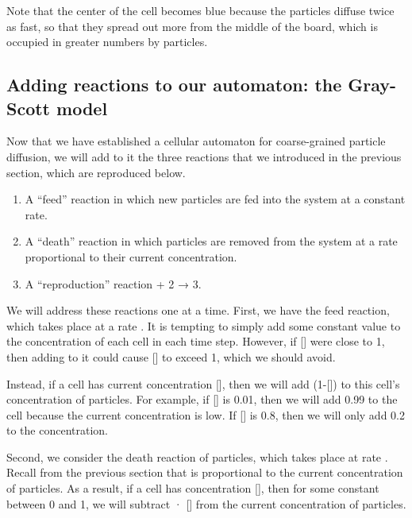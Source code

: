 {{Note that the center of the cell becomes blue because the  particles diffuse twice as fast, so that they spread out more from the middle of the board, which is occupied in greater numbers by  particles.

\FloatBarrier
{}
\subsection{Adding reactions to our automaton: the Gray-Scott model}

Now that we have established a cellular automaton for coarse-grained particle diffusion, we will add to it the three reactions that we introduced in the previous section, which are reproduced below.

\begin{enumerate}
\item A ``feed'' reaction in which new  particles are fed into the system at a constant rate.
\item A ``death'' reaction in which  particles are removed from the system at a rate proportional to their current concentration.
\item A ``reproduction'' reaction  + 2 → 3.
\end{enumerate}

\begin{qbox}\end{qbox}

We will address these reactions one at a time. First, we have the feed reaction, which takes place at a rate . It is tempting to simply add some constant value  to the concentration of each cell in each time step. However, if [] were close to 1, then adding  to it could cause [] to exceed 1, which we should avoid.

Instead, if a cell has current concentration [], then we will add (1-[]) to this cell's concentration of  particles. For example, if [] is 0.01, then we will add 0.99 to the cell because the current concentration is low. If [] is 0.8, then we will only add 0.2 to the concentration.

Second, we consider the death reaction of  particles, which takes place at rate . Recall from the previous section that  is proportional to the current concentration of  particles. As a result, if a cell has concentration [], then for some constant  between 0 and 1, we will subtract  · [] from the current concentration of  particles.

}}
